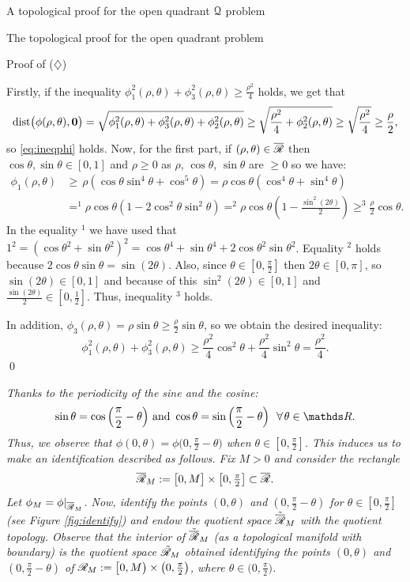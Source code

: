 \documentclass[11pt, a4paper, english, twoside, notitlepage, openright]{report}
\begin{document}
\begin{chapter}{A topological proof for the open quadrant $\mathcal{Q}$ problem}
\begin{section}{The topological proof for the open quadrant problem}
\begin{subsection}{Proof of ($\diamondsuit$)}
\begin{lemma}
\begin{Proof}
Firstly, if the inequality $\phi_1^2(\rho,\theta)+\phi_3^2(\rho,\theta)\ge\frac{\rho^2}{4}$ holds, we get that
$$
\text{dist}\big(\phi(\rho,\theta),{\bf0}\big)=\sqrt{\phi_1^2(\rho,\theta)+\phi_3^2(\rho,\theta) + \phi_2^2(\rho,\theta)}\ge\sqrt{\frac{\rho^2}{4} + \phi_2^2(\rho,\theta)}\ge\sqrt{\frac{\rho^2}{4}}\ge\frac{\rho}{2},
$$
so \ref{eq:ineqphi} holds. Now, for the first part, if $(\rho,\theta)\in\overline{\mathscr{R}}$ then $\cos\theta, \sin\theta \in[0,1]$ and $\rho\ge0$ as $\rho$, $\cos\theta$, $\sin\theta$ are $\geq0$ so we have:
\begin{align*}
\phi_1(\rho,\theta)&\ge\,\rho(\cos\theta\sin^4\theta+\cos^5\theta)=\rho\cos\theta(\cos^4\theta+\sin^4\theta)\\
&=^1\rho\cos\theta(1-2\cos^2\theta\sin^2\theta)=^2\rho\cos\theta\left(1-\frac{\sin^2(2\theta)}{2}\right)
\ge^3 \frac{\rho}{2}\cos\theta.
\end{align*}
In the equality $^1$ we have used that $1^2=(\cos\theta^2+\sin\theta^2)^2=\cos\theta^4+\sin\theta^4+2\cos\theta^2\sin\theta^2$. Equality $^2$ holds because $2\cos\theta\sin\theta=\sin(2\theta)$. Also, since $\theta\in[0,\tfrac{\pi}{2}]$ then $2\theta\in[0,\pi]$, so $\sin(2\theta)\in[0,1]$ and because of this $\sin^2(2\theta)\in[0,1]$ and $\tfrac{\sin(2\theta)}{2}\in[0,\tfrac{1}{2}]$. Thus, inequality $^3$ holds.

In addition, $\phi_3(\rho,\theta)=\rho\sin\theta\ge\frac{\rho}{2}\sin\theta$, so we obtain the desired inequality:
$$
\phi_1^2(\rho,\theta)+\phi_3^2(\rho,\theta)\ge \frac{\rho^2}{4}\cos^2\theta+\frac{\rho^2}{4}\sin^2\theta=\frac{\rho^2}{4}.
$$
\qed
\end{Proof}
\end{lemma}

\begin{constr}\label{quotConstr}
\em
Thanks to the periodicity of the sine and the cosine:
$$
\sin\theta=\cos\Big(\frac{\pi}{2}-\theta\Big)\text{ and } \cos\theta=\sin\Big(\frac{\pi}{2}-\theta\Big)\ \ \forall\theta\in\R.
$$
Thus, we observe that $\phi(0,\theta)=\phi\big(0,\tfrac{\pi}{2}-\theta\big)$ when $\theta\in[0,\tfrac{\pi}{2}]$. This induces us to make an identification described as follows. Fix $M>0$ and consider the rectangle 
$$
\overline{\mathscr{R}}_M:=\big[0,M\big]\times\big[0,\tfrac{\pi}{2}\big]\subset\overline{\mathscr{R}}.
$$
Let $\phi_M=\phi|_{\overline{\mathscr{R}}_M}$. Now, identify the points $(0,\theta)$ and $(0,\frac{\pi}{2}-\theta)$ for $\theta\in[0,\tfrac{\pi}{2}]$ (see Figure \ref{fig:identify}) and endow the quotient space $\tilde{\overline{\mathscr{R}}}_M$ with the quotient topology. Observe that the interior of $\tilde{\overline{\mathscr{R}}}_M$ (as a topological manifold with boundary) is the quotient space $\tilde{\mathscr{R}}_M$ obtained identifying the points $(0,\theta)$ and $(0,\frac{\pi}{2}-\theta)$ of $\mathscr{R}_M:=\big[0,M\big)\times\big(0,\tfrac{\pi}{2}\big)$, where $\theta\in\big(0,\tfrac{\pi}{2}\big)$.


\end{constr}
\end{subsection}
\end{section}
\end{chapter}
\end{document}
